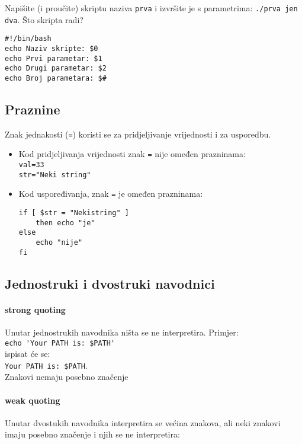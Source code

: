 \begin{zadatak}
Napišite (i proučite) skriptu naziva \texttt{prva} i izvršite je s parametrima: \texttt{./prva jen dva}. Što skripta radi?
\begin{lstlisting}
#!/bin/bash
echo Naziv skripte: $0
echo Prvi parametar: $1
echo Drugi parametar: $2
echo Broj parametara: $#
\end{lstlisting}
\end{zadatak}

\subsection*{Praznine}
Znak jednakosti (\lstinline!=!) koristi se za pridjeljivanje vrijednosti i za usporedbu.
\begin{itemize}
\item 
Kod pridjeljivanja vrijednosti znak \lstinline!=! nije omeđen prazninama:\\ 
\lstinline!val=33! \\
\lstinline!str="Neki string"!

\item Kod uspoređivanja, znak \texttt{=} je omeđen prazninama:
\begin{lstlisting}
if [ $str = "Nekistring" ]
	then echo "je"
else 
	echo "nije"
fi
\end{lstlisting}
\end{itemize}

\subsection*{Jednostruki i dvostruki navodnici}

\paragraph{strong quoting} Unutar jednostrukih navodnika ništa se ne interpretira. Primjer: \\ \lstinline!echo 'Your PATH is: $PATH' ! \\ 
ispisat će se: \\
\lstinline!Your PATH is: $PATH!. \\
Znakovi nemaju posebno značenje

\paragraph{weak quoting} Unutar dvostukih navodnika interpretira se većina znakova, ali neki znakovi imaju posebno značenje i njih se ne interpretira:

